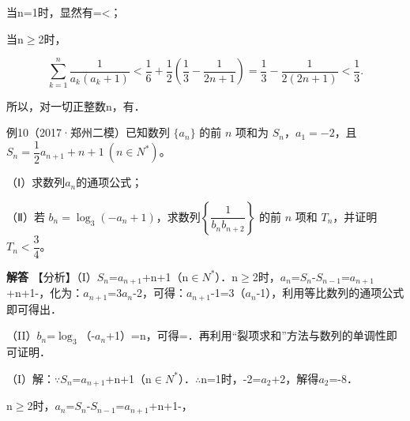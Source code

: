 当n=1时，显然有=<；\par
当n\ensuremath{\ge}2时，\par
\[\sum_{k=1}^{n}\frac1{a_k(a_k+1)}<\frac16+\frac12\left(\frac13-\frac1{2n+1}\right)=\frac13-\frac1{2(2n+1)}<\frac13.\]\par
所以，对一切正整数n，有．\par
\par\endgroup\fi

例10（2017·郑州二模）已知数列 $\{a_n\}$ 的前 $n$ 项和为 $S_n$，$a_1=-2$，且 $S_n=\dfrac12a_{n+1}+n+1\ (n\in N^*)$。\par
（Ⅰ）求数列{\ensuremath{a_{n}}}的通项公式；\par
（Ⅱ）若 $b_n=\log_3(-a_n+1)$，求数列$\left\{\dfrac1{b_nb_{n+2}}\right\}$ 的前 $n$ 项和 $T_n$，并证明 $T_n<\dfrac34$。\par
\QuestionSpace{4.8cm}
\ifshowanswers
\par\begingroup\color{solutioncolor}\noindent\textbf{解答}\quad
【分析】（I）\ensuremath{S_{n}}=\ensuremath{a_{n+1}}+n+1（n\ensuremath{\in}\ensuremath{N^{*}}）．n\ensuremath{\ge}2时，\ensuremath{a_{n}}=\ensuremath{S_{n}}-\ensuremath{S_{n-1}}=\ensuremath{a_{n+1}}+n+1-，化为：\ensuremath{a_{n+1}}=3\ensuremath{a_{n}}-2，可得：\ensuremath{a_{n+1}}-1=3（\ensuremath{a_{n}}-1），利用等比数列的通项公式即可得出．\par
（II）\ensuremath{b_{n}}=\ensuremath{\log_{3}}（-\ensuremath{a_{n}}+1）=n，可得=．再利用“裂项求和”方法与数列的单调性即可证明．\par
（I）解：\ensuremath{\because}\ensuremath{S_{n}}=\ensuremath{a_{n+1}}+n+1（n\ensuremath{\in}\ensuremath{N^{*}}）．\ensuremath{\therefore}n=1时，-2=\ensuremath{a_{2}}+2，解得\ensuremath{a_{2}}=-8．\par
n\ensuremath{\ge}2时，\ensuremath{a_{n}}=\ensuremath{S_{n}}-\ensuremath{S_{n-1}}=\ensuremath{a_{n+1}}+n+1-，\par
